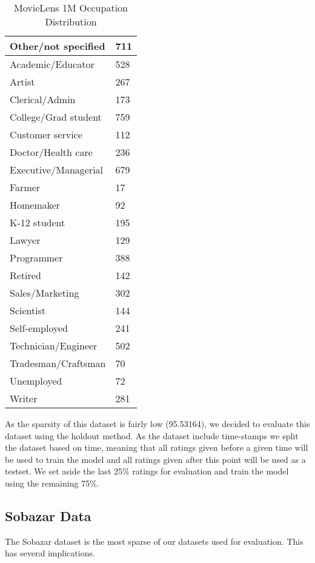 \begin{table}[H]
\centering
\begin{tabular}{|l|l|}
\hline
Other/not specified  & 711  \\ \hline
Academic/Educator  & 528  \\ \hline
Artist  & 267 \\ \hline
Clerical/Admin & 173 \\ \hline
College/Grad student  & 759 \\ \hline
Customer service & 112 \\ \hline
Doctor/Health care & 236 \\ \hline
Executive/Managerial & 679 \\ \hline
Farmer & 17 \\ \hline
Homemaker & 92 \\ \hline
K-12 student & 195 \\ \hline
Lawyer & 129 \\ \hline
Programmer & 388 \\ \hline
Retired & 142 \\ \hline
Sales/Marketing & 302 \\ \hline
Scientist & 144 \\ \hline
Self-employed & 241 \\ \hline
Technician/Engineer & 502 \\ \hline
Tradesman/Craftsman & 70 \\ \hline
Unemployed & 72 \\ \hline
Writer & 281 \\ \hline
\end{tabular}
\caption{MovieLens 1M Occupation Distribution}
\end{table}

As the sparsity of this dataset is fairly low (95.53164), we decided to evaluate this dataset using the holdout method. As the dataset include time-stamps we split the dataset based on time, meaning that all ratings given before a given time will be used to train the model and all ratings given after this point will be used as a testset. We set aside the last 25\% ratings for evaluation and train the model using the remaining 75\%.


\subsection{Sobazar Data}

The Sobazar dataset is the most sparse of our datasets used for evaluation. This has several implications. 


